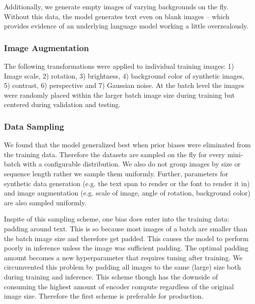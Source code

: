 \documentclass[runningheads]{llncs}
\begin{document}
Additionally, we generate empty images of varying backgrounds on the fly. Without this data, the model generates text even on blank images -- which provides evidence of an underlying language model working a little overzealously.

\subsubsection{Image Augmentation}
The following transformations were applied to individual training images: 1) Image scale, 2) rotation, 3) brightness, 4) background color of synthetic images, 5) contrast, 6) perspective and 7) Gaussian noise. At the batch level the images were randomly placed within the larger batch image size during training but centered during validation and testing.

\subsubsection{Data Sampling}
We found that the model generalized best when prior biases were eliminated from the training data. Therefore the datasets are sampled on the fly for every mini-batch with a configurable distribution. We also do not group images by size or sequence length rather we sample them uniformly. Further, parameters for synthetic data generation (e.g. the text span to render or the font to render it in) and image augmentation (e.g. scale of image, angle of rotation, background color) are also sampled uniformly.

Inspite of this sampling scheme, one bias does enter into the training data: padding around text. This is so because most images of a batch are smaller than the batch image size and therefore get padded. This causes the model to perform poorly in inference unless the image was sufficient padding. The optimal padding amount becomes a new hyperparameter that requires tuning after training. We circumvented this problem by padding all images to the same (large) size both during training and inference. This scheme though has the downside of consuming the highest amount of encoder compute regardless of the original image size. Therefore the first scheme is preferable for production.
\end{document}
